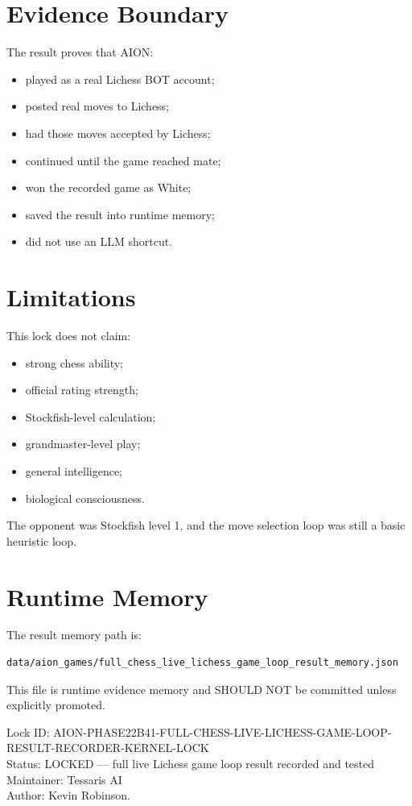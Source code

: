 \documentclass[11pt,a4paper]{article}
\begin{document}
\section{Evidence Boundary}

The result proves that AION:

\begin{itemize}
  \item played as a real Lichess BOT account;
  \item posted real moves to Lichess;
  \item had those moves accepted by Lichess;
  \item continued until the game reached mate;
  \item won the recorded game as White;
  \item saved the result into runtime memory;
  \item did not use an LLM shortcut.
\end{itemize}

\section{Limitations}

This lock does not claim:

\begin{itemize}
  \item strong chess ability;
  \item official rating strength;
  \item Stockfish-level calculation;
  \item grandmaster-level play;
  \item general intelligence;
  \item biological consciousness.
\end{itemize}

The opponent was Stockfish level 1, and the move selection loop was still a basic heuristic loop.

\section{Runtime Memory}

The result memory path is:

\begin{verbatim}
data/aion_games/full_chess_live_lichess_game_loop_result_memory.json
\end{verbatim}

This file is runtime evidence memory and SHOULD NOT be committed unless explicitly promoted.

\bigskip

\noindent
Lock ID: AION-PHASE22B41-FULL-CHESS-LIVE-LICHESS-GAME-LOOP-RESULT-RECORDER-KERNEL-LOCK\\
Status: LOCKED --- full live Lichess game loop result recorded and tested\\
Maintainer: Tessaris AI\\
Author: Kevin Robinson.
\end{document}
